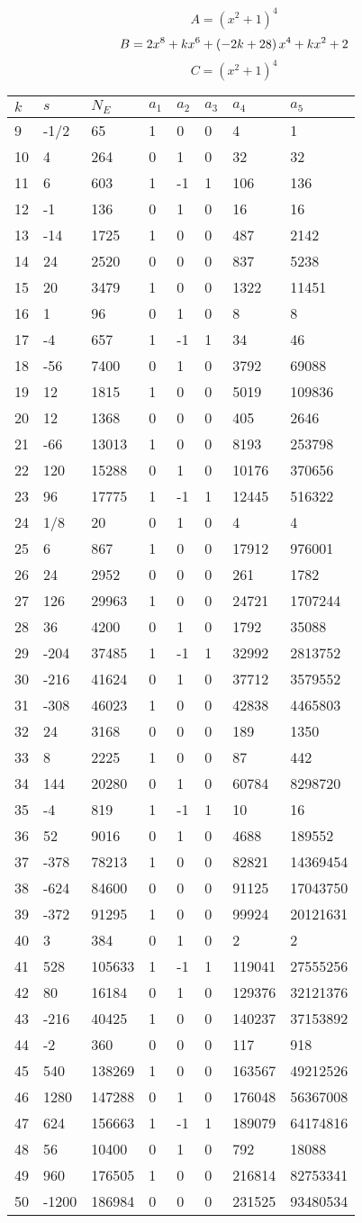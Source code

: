 \documentclass{amsart}
\begin{document}
$$A=(x^2
 + 1)^{4}$$
$$B=2\*x^8
 + k\*x^6
 + \left(-2\*k
 + 28\right) \*x^4
 + k\*x^2
 + 2$$
$$C=(x^2
 + 1)^{4}$$
\begin{longtable}{|l|l|l|lllll|}
\hline
$k$ & $s$ & $N_E$ & $a_1$ & $a_2$ & $a_3$ & $a_4$ & $a_5$\\
\hline
9&-1/2&65&1&0&0&4&1\\
10&4&264&0&1&0&32&32\\
11&6&603&1&-1&1&106&136\\
12&-1&136&0&1&0&16&16\\
13&-14&1725&1&0&0&487&2142\\
14&24&2520&0&0&0&837&5238\\
15&20&3479&1&0&0&1322&11451\\
16&1&96&0&1&0&8&8\\
17&-4&657&1&-1&1&34&46\\
18&-56&7400&0&1&0&3792&69088\\
19&12&1815&1&0&0&5019&109836\\
20&12&1368&0&0&0&405&2646\\
21&-66&13013&1&0&0&8193&253798\\
22&120&15288&0&1&0&10176&370656\\
23&96&17775&1&-1&1&12445&516322\\
24&1/8&20&0&1&0&4&4\\
25&6&867&1&0&0&17912&976001\\
26&24&2952&0&0&0&261&1782\\
27&126&29963&1&0&0&24721&1707244\\
28&36&4200&0&1&0&1792&35088\\
29&-204&37485&1&-1&1&32992&2813752\\
30&-216&41624&0&1&0&37712&3579552\\
31&-308&46023&1&0&0&42838&4465803\\
32&24&3168&0&0&0&189&1350\\
33&8&2225&1&0&0&87&442\\
34&144&20280&0&1&0&60784&8298720\\
35&-4&819&1&-1&1&10&16\\
36&52&9016&0&1&0&4688&189552\\
37&-378&78213&1&0&0&82821&14369454\\
38&-624&84600&0&0&0&91125&17043750\\
39&-372&91295&1&0&0&99924&20121631\\
40&3&384&0&1&0&2&2\\
41&528&105633&1&-1&1&119041&27555256\\
42&80&16184&0&1&0&129376&32121376\\
43&-216&40425&1&0&0&140237&37153892\\
44&-2&360&0&0&0&117&918\\
45&540&138269&1&0&0&163567&49212526\\
46&1280&147288&0&1&0&176048&56367008\\
47&624&156663&1&-1&1&189079&64174816\\
48&56&10400&0&1&0&792&18088\\
49&960&176505&1&0&0&216814&82753341\\
50&-1200&186984&0&0&0&231525&93480534\\
\hline
\end{longtable}
\end{document}
